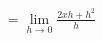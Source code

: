\documentclass[preview]{standalone}
\begin{document}
\begin{align*}
= \lim_{h \to 0} \frac{2xh + h^2}{h}
\end{align*}
\end{document}
